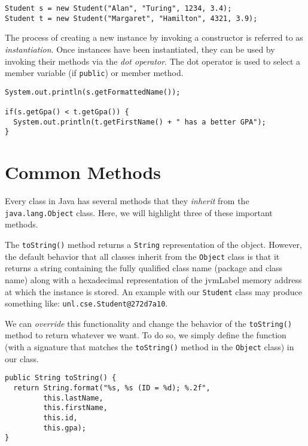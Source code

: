 \begin{verbatim}
Student s = new Student("Alan", "Turing", 1234, 3.4);
Student t = new Student("Margaret", "Hamilton", 4321, 3.9);
\end{verbatim}

The process of creating a new instance by invoking a constructor is
referred to as \emph{instantiation}.  Once instances have been instantiated,
they can be used by invoking their methods via the \emph{dot operator}.
The dot operator is used to select a member variable (if 
\texttt{public}) or member method.

\begin{verbatim}
System.out.println(s.getFormattedName());

if(s.getGpa() < t.getGpa()) {
  System.out.println(t.getFirstName() + " has a better GPA");
}
\end{verbatim}

\section{Common Methods}
\label{section:javaCommonMethods}

Every class in Java has several methods that they \emph{inherit} 
from the \texttt{java.lang.Object} class.  Here, we will 
highlight three of these important methods.

The \texttt{toString()} method returns a \texttt{String}
representation of the object.  However, the default behavior that all
classes inherit from the \texttt{Object} class is that it
returns a string containing the fully qualified class name 
(package and class name) along with a \gls{hexadecimal}
representation of the \gls{jvmLabel} memory address at which the
instance is stored.  An example with our \texttt{Student}
class may produce something like: \texttt{unl.cse.Student@272d7a10}.

We can \emph{override} this functionality and change the behavior
of the \texttt{toString()} method to return whatever we want.
To do so, we simply define the function (with a signature that matches
the \texttt{toString()} method in the \texttt{Object}
class) in our class.  

\begin{verbatim}
public String toString() {
  return String.format("%s, %s (ID = %d); %.2f", 
         this.lastName,
         this.firstName,
         this.id,
         this.gpa);
}
\end{verbatim}

